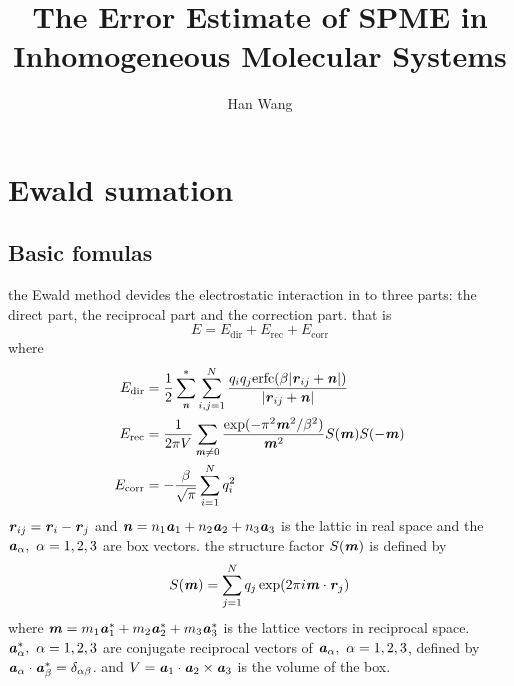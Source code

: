 \documentclass[aps,pre,preprint]{revtex4}
\renewcommand{\v}[1]{\textbf{\textit{#1}}}
\begin{document}
\title{The Error Estimate of SPME in Inhomogeneous Molecular Systems}
\author{Han Wang}

\begin{abstract}
\end{abstract}



\section{Ewald sumation}
\subsection{Basic fomulas}
the Ewald method devides the electrostatic interaction in to three
parts: the direct part, the reciprocal part and the correction
part. that is
\begin{equation}
E = E_{\textrm{dir}} + E_{\textrm{rec}} + E_{\textrm{corr}}
\end{equation}
where 
\begin {align}
E_{\textrm{dir}} & = \frac12 \sum^{\ast}_{\v n}
\sum_{i,j = 1}^{N} \frac{q_iq_j \textrm{erfc}(\beta \vert\v{r}_{ij} + \v{n}\vert)}
{\vert\v{r}_{ij} + \v{n}\vert} \\
E_{\textrm{rec}} & = \frac1{2\pi V} \sum_{\v m \neq 0}
\frac{\exp(-\pi^2\v m^2 / \beta^2)}{\v m^2} S(\v m) S(-\v m) \\
 E_{\textrm{corr}}& = -\frac\beta{\sqrt \pi} \sum_{i=1}^N q_i^2
\end {align}
$\v r_{ij} = \v r_i - \v r_j$ and $\v n = n_1 \v a_1 + n_2 \v a_2 +
n_3 \v a_3$ is the lattic in real space and the $\v a_\alpha, \
\alpha=1,2,3$ are box vectors. the structure factor $S(\v m)$ is
defined by
\begin{equation}\label{sm1}
S(\v m) = \sum_{j=1}^N q_j \exp (2 \pi i \v m \cdot \v r_j)
\end{equation}
where $\v m = m_1 \v a_1^\ast + m_2 \v a_2^\ast + m_3 \v a_3^\ast$ is
the lattice vectors in reciprocal space. $\v a_\alpha^\ast,\ \alpha =
1, 2, 3$ are conjugate reciprocal vectors of $\v a_\alpha,\ \alpha =
1, 2, 3$, defined by $\v a_\alpha \cdot \v a_\beta^\ast =
\delta_{\alpha\beta}$. and $V = \v a_1 \cdot \v a_2 \times \v a_3$ is
the volume of the box.
\end{document}
